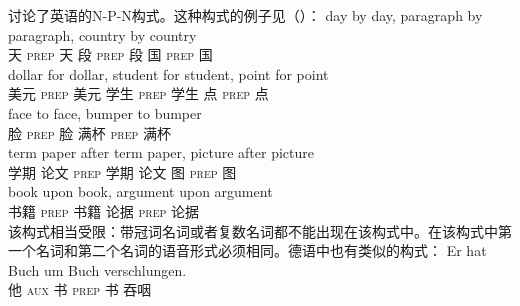 \begin{exe}
\begin{xlist}[iv.]
\begin{exe}
\begin{xlist}[iv.]
\mbox{}\citet{Jackendoff2008a}讨论了英语的N-P-N构式。这种构式的例子见（）：
\eal
\ex 
\gll day by day, paragraph by paragraph, country by country\\
     天 \textsc{prep} 天 段 \textsc{prep} 段 国 \textsc{prep} 国\\
\ex
\gll dollar for dollar, student for student, point for point\\
     美元 \textsc{prep} 美元 学生 \textsc{prep} 学生 点 \textsc{prep} 点\\
\ex 
\gll face to face, bumper to bumper\\
     脸 \textsc{prep} 脸 满杯 \textsc{prep} 满杯\\
\ex
\gll term paper after term paper, picture after picture\\
     学期 论文 \textsc{prep} 学期 论文 图 \textsc{prep} 图\\
\ex 
\gll book upon book, argument upon argument\\
     书籍 \textsc{prep} 书籍 论据 \textsc{prep} 论据\\
\zl
该构式相当受限：带冠词名词或者复数名词都不能出现在该构式中。在该构式中第一个名词和第二个名词的语音形式必须相同。德语中也有类似的构式：
\eal
\ex 
\gll Er hat Buch um Buch verschlungen.\\
	 他 \textsc{aux} 书 \textsc{prep} 书 吞咽\\

\end{xlist}
\end{exe}
\end{xlist}
\end{exe}
